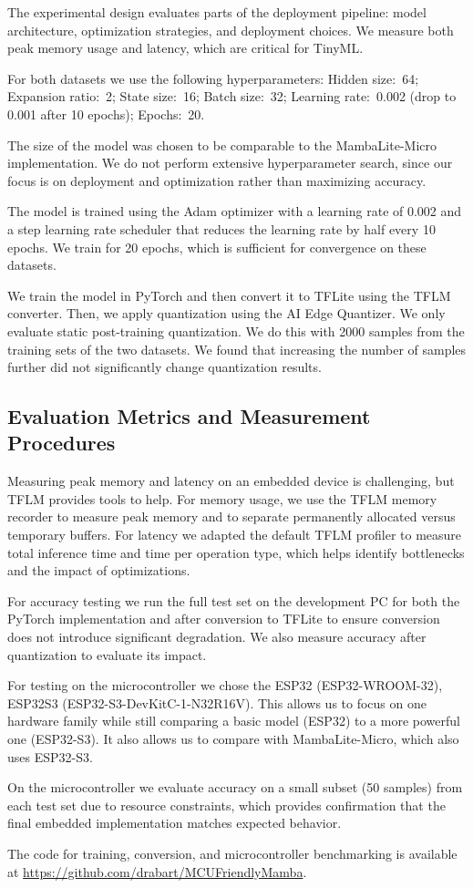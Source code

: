 The experimental design evaluates parts of the deployment pipeline: model architecture, optimization strategies, and deployment choices. We measure both peak memory usage and latency, which are critical for TinyML.

For both datasets we use the following hyperparameters:
Hidden size:~64;
Expansion ratio:~2;
State size:~16;
Batch size:~32;
Learning rate:~0.002 (drop to 0.001 after 10 epochs);
Epochs:~20.

The size of the model was chosen to be comparable to the MambaLite-Micro implementation. We do not perform extensive hyperparameter search, since our focus is on deployment and optimization rather than maximizing accuracy.

The model is trained using the Adam optimizer with a learning rate of 0.002 and a step learning rate scheduler that reduces the learning rate by half every 10 epochs. We train for 20 epochs, which is sufficient for convergence on these datasets.

We train the model in PyTorch and then convert it to TFLite using the TFLM converter. Then, we apply quantization using the AI Edge Quantizer. We only evaluate static post-training quantization. We do this with 2000 samples from the training sets of the two datasets. We found that increasing the number of samples further did not significantly change quantization results.

\subsection{Evaluation Metrics and Measurement Procedures}

Measuring peak memory and latency on an embedded device is challenging, but TFLM provides tools to help. For memory usage, we use the TFLM memory recorder to measure peak memory and to separate permanently allocated versus temporary buffers. For latency we adapted the default TFLM profiler to measure total inference time and time per operation type, which helps identify bottlenecks and the impact of optimizations.

For accuracy testing we run the full test set on the development PC for both the PyTorch implementation and after conversion to TFLite to ensure conversion does not introduce significant degradation. We also measure accuracy after quantization to evaluate its impact.

For testing on the microcontroller we chose the ESP32 (ESP32-WROOM-32), ESP32S3 (ESP32-S3-DevKitC-1-N32R16V). This allows us to focus on one hardware family while still comparing a basic model (ESP32) to a more powerful one (ESP32-S3). It also allows us to compare with MambaLite-Micro, which also uses ESP32-S3.

On the microcontroller we evaluate accuracy on a small subset (50 samples) from each test set due to resource constraints, which provides confirmation that the final embedded implementation matches expected behavior.

The code for training, conversion, and microcontroller benchmarking is available at \url{https://github.com/drabart/MCUFriendlyMamba}.
